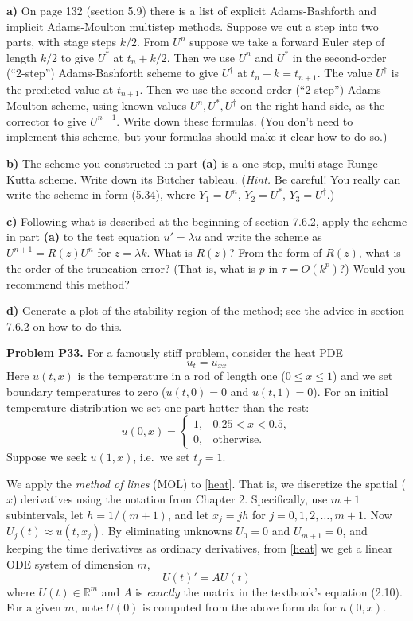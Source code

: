 \documentclass[12pt]{amsart}
\newcommand{\RR}{\mathbb{R}}
\newcommand{\prob}[1]{\bigskip\noindent\textbf{#1}\quad }
\newcommand{\epart}[1]{\medskip\noindent\textbf{#1)}\quad }
\begin{document}
\epart{a}  On page 132 (section 5.9) there is a list of explicit Adams-Bashforth and implicit Adams-Moulton multistep methods.  Suppose we cut a step into two parts, with stage steps $k/2$.  From $U^n$ suppose we take a  forward Euler step of length $k/2$ to give $U^*$ at $t_n+k/2$.  Then we use $U^n$ and $U^*$ in the second-order (``2-step'') Adams-Bashforth scheme to give $U^\dagger$ at $t_n+k=t_{n+1}$.  The value $U^\dagger$ is the predicted value at $t_{n+1}$.  Then we use the second-order (``2-step'') Adams-Moulton scheme, using known values $U^n,U^*,U^\dagger$ on the right-hand side, as the corrector to give $U^{n+1}$.  Write down these formulas.  (You don't need to implement this scheme, but your formulas should make it clear how to do so.)

\epart{b}  The scheme you constructed in part \textbf{(a)} is a one-step, multi-stage Runge-Kutta scheme.  Write down its Butcher tableau.  (\emph{Hint.}  Be careful!  You really can write the scheme in form (5.34), where $Y_1=U^n$, $Y_2=U^*$, $Y_3=U^\dagger$.)

\epart{c}  Following what is described at the beginning of section 7.6.2, apply the scheme in part \textbf{(a)} to the test equation $u'=\lambda u$ and write the scheme as $U^{n+1} = R(z) U^n$ for $z=\lambda k$.  What is $R(z)$?  From the form of $R(z)$, what is the order of the truncation error?  (That is, what is $p$ in $\tau=O(k^p)$?)  Would you recommend this method?

\epart{d} Generate a plot of the stability region of the method; see the advice in section 7.6.2 on how to do this.


\prob{Problem P33.}  For a famously stiff problem, consider the heat PDE
\begin{equation}
u_t = u_{xx}  \label{heat}
\end{equation}
Here $u(t,x)$ is the temperature in a rod of length one ($0 \le x \le 1$) and we set boundary temperatures to zero ($u(t,0)=0$ and $u(t,1)=0$).  For an initial temperature distribution we set one part hotter than the rest:
    $$u(0,x) = \begin{cases} 1, & 0.25 < x < 0.5, \\
                             0, & \text{otherwise}.\end{cases}$$
Suppose we seek $u(1,x)$, i.e.~we set $t_f = 1$.

We apply the \emph{method of lines} (MOL) to \eqref{heat}.  That is, we discretize the spatial ($x$) derivatives using the notation from Chapter 2.  Specifically, use $m+1$ subintervals, let $h=1/(m+1)$, and let $x_j = j h$ for $j=0,1,2,\dots,m+1$.  Now $U_j(t) \approx u(t,x_j)$.  By eliminating unknowns $U_0=0$ and $U_{m+1}=0$, and keeping the time derivatives as ordinary derivatives, from \eqref{heat} we get a linear ODE system of dimension $m$,
\begin{equation}
U(t)' = A U(t)  \label{mol}
\end{equation}
where $U(t) \in \RR^m$ and $A$ is \emph{exactly} the matrix in the textbook's equation (2.10).  For a given $m$, note $U(0)$ is computed from the above formula for $u(0,x)$.
\end{document}

